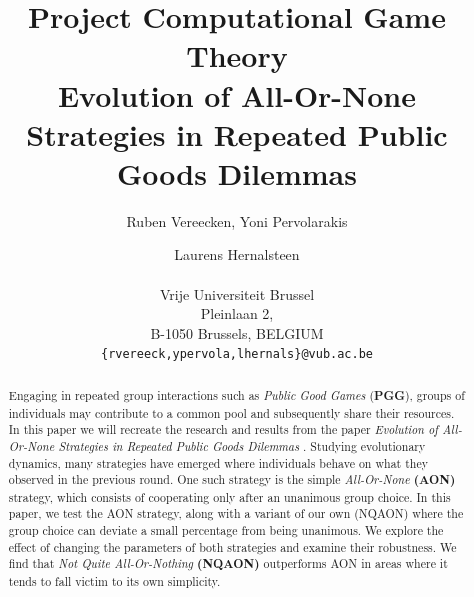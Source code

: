 \documentclass[letterpaper]{article}
\title{Project Computational Game Theory\\Evolution of All-Or-None Strategies in Repeated Public Goods Dilemmas}
\author{Ruben Vereecken, Yoni Pervolarakis \and Laurens Hernalsteen \\
\mbox{}\\Vrije Universiteit Brussel \\Pleinlaan 2, \\B-1050 Brussels, BELGIUM\\
{\texttt{\{rvereeck,ypervola,lhernals\}@vub.ac.be}}}
\begin{document}
\maketitle

\begin{abstract}
Engaging in repeated group interactions such as  \textit{Public Good Games}  (\textbf{PGG}), groups of individuals may contribute to a
common pool and subsequently share their resources. In this
paper we will recreate the research and results from the paper
\textit{Evolution of All-Or-None Strategies in Repeated Public Goods Dilemmas}  \citep{project}. Studying evolutionary dynamics, many strategies have emerged where individuals behave on what they observed in the previous round. One such strategy is the simple \textit{All-Or-None} \textbf{(AON)} strategy, which consists of cooperating only after an unanimous group choice. In this paper, we test the AON strategy, along with a variant of our own (NQAON) where the group choice can deviate a small percentage from being unanimous. We explore the effect of changing the parameters of both strategies and examine their robustness. We find that \textit{Not Quite All-Or-Nothing} \textbf{(NQAON)} outperforms AON in areas where it tends to fall victim to its own simplicity.


\end{abstract}
\end{document}
